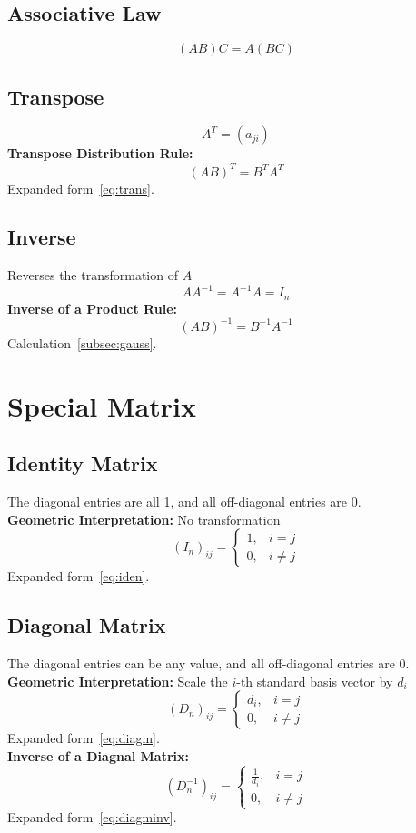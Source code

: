\documentclass{article}
\begin{document}
\subsection{Associative Law}
\[
    (AB)C = A(BC)
\]

\subsection{Transpose}
\[
    A^T = (a_{ji})
\]
\textbf{Transpose Distribution Rule:}
\[
    (AB)^T = B^T A^T
\]
Expanded form~\ref{eq:trans}.

\subsection{Inverse}
Reverses the transformation of $A$
\[
    A A^{-1} = A^{-1} A = I_n
\]
\textbf{Inverse of a Product Rule:}
\[
    (AB)^{-1} = B^{-1}A^{-1}
\]
Calculation~\ref{subsec:gauss}.


\newpage
\section{Special Matrix}

\subsection{Identity Matrix}
The diagonal entries are all 1, and all off-diagonal entries are 0.\\
\textbf{Geometric Interpretation:} No transformation
\[
    (I_n)_{ij} =
    \begin{cases}
        1, & i = j \\
        0, & i \neq j
    \end{cases}
\]
Expanded form~\ref{eq:iden}.

\subsection{Diagonal Matrix}
The diagonal entries can be any value, and all off-diagonal entries are 0.\\
\textbf{Geometric Interpretation:} Scale the $i$-th standard basis vector by $d_i$
\[
    (D_n)_{ij} =
    \begin{cases}
        d_i, & i = j \\
        0, & i \neq j
    \end{cases}
\]
Expanded form~\ref{eq:diagm}.\\
\textbf{Inverse of a Diagnal Matrix:}
\[
    (D_n^{-1})_{ij} =
    \begin{cases}
        \frac{1}{d_i}, & i = j \\
        0, & i \neq j
    \end{cases}
\]
Expanded form~\ref{eq:diagminv}.
\end{document}
